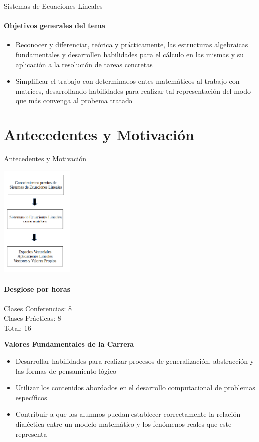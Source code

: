 \documentclass{beamer}
\begin{document}
\begin{frame}{Sistemas de Ecuaciones Lineales}
  \framesubtitle{Objetivos generales del tema}
  \begin{itemize}
    \item Reconocer y diferenciar, teórica y prácticamente, las estructuras algebraicas fundamentales
          y desarrollen habilidades para el cálculo en las mismas y su aplicación a la resolución de tareas
          concretas
    \item Simplificar el trabajo con determinados entes matemáticos al trabajo con matrices,
          desarrollando habilidades para realizar tal representación del modo que más convenga al probema tratado
  \end{itemize}

\end{frame}

\section{Antecedentes y Motivación}
\begin{frame}{Antecedentes y Motivación}
  \begin{center}
    \includegraphics[width=3.5cm]{images/Grafica3.png}
  \end{center}
\end{frame}

\begin{frame}
  \framesubtitle{Desglose por horas}
  {\centering \Large Clases Conferencias: 8\\
    Clases Prácticas: 8\\
    Total: 16\\}
\end{frame}

\begin{frame}
  \begin{center}
    {\bf \Large Valores Fundamentales de la Carrera}
  \end{center}
  \begin{itemize}
    \item Desarrollar habilidades para realizar  procesos de generalización, abstracción y las formas de pensamiento lógico
    \item Utilizar los contenidos abordados en el desarrollo computacional de problemas específicos
    \item Contribuir a que los alumnos puedan establecer correctamente la relación dialéctica entre
          un modelo matemático y los fenómenos reales que este representa
  \end{itemize}

\end{frame}
\end{document}

